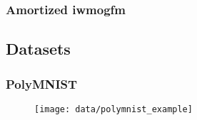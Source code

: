 \subsubsection{Amortized iwmogfm}

\subsection{Datasets}

\subsubsection{PolyMNIST} \label{polymnist}
\begin{figure}[h!]
    \centering
    \texttt{[image: data/polymnist\_example]}
\end{figure}